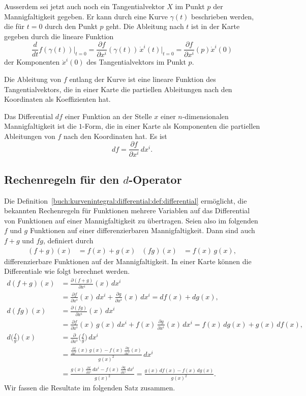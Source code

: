 Ausserdem sei jetzt auch noch ein Tangentialvektor $X$ im Punkt
$p$ der Mannigfaltigkeit gegeben.
Er kann durch eine Kurve $\gamma(t)$ beschrieben werden, die
für $t=0$ durch den Punkt $p$ geht.
Die Ableitung nach $t$ ist in der Karte gegeben durch die
lineare Funktion
\[
\frac{d}{dt}
f(\gamma(t))
\bigg|_{t=0}
=
\frac{\partial f}{\partial x^i}(\gamma(t))\,\dot{x}^i(t)\bigg|_{t=0}
=
\frac{\partial f}{\partial x^i}(p)\dot{x}^i(0)
\]
der Komponenten $\dot{x}^i(0)$ des Tangentialvektors im Punkt $p$.

Die Ableitung von $f$ entlang der Kurve ist eine lineare 
Funktion des Tangentialvektors, die in einer Karte die
partiellen Ableitungen nach den Koordinaten als Koeffizienten
hat.

\begin{definition}
\label{buch:kurvenintegral:differential:def:differential}
Das Differential $df$ einer Funktion an der Stelle $x$ einer
$n$-dimensionalen Mannigfaltigkeit ist die $1$-Form, die in einer
Karte als Komponenten die partiellen Ableitungen von $f$ nach den
Koordinaten hat.
Es ist
\[
df
=
\frac{\partial f}{\partial x^i}\,dx^i.
\]
\end{definition}

%
%
\subsection{Rechenregeln für den $d$-Operator}
Die Definition~\ref{buch:kurvenintegral:differential:def:differential}
ermöglicht, die bekannten Rechenregeln für Funktionen mehrere Variablen
auf das Differential von Funktionen auf einer Mannigfaltigkeit zu
übertragen.
Seien also im folgenden $f$ und $g$ Funktionen auf einer differenzierbaren
Mannigfaltigkeit.
Dann sind auch $f+g$ und $fg$, definiert durch
\begin{align*}
(f+g)(x) &= f(x)+g(x)
&
(fg)(x) &= f(x)\,g(x),
\end{align*}
differenzierbare Funktionen auf der Mannigfaltigkeit.
In einer Karte können die Differentiale wie folgt berechnet werden.
\begin{align*}
d(f+g)(x)
&=
\frac{\partial(f+g)}{\partial x^i}(x)\,dx^i
\\
&=
\frac{\partial f}{\partial x^i}(x)\,dx^i
+
\frac{\partial g}{\partial x^i}(x)\,dx^i
=
df(x) + dg(x),
\\
d(fg)(x)
&=
\frac{\partial (fg)}{\partial x^i}(x)\,dx^i
\\
&=
\frac{\partial f}{\partial x^i}(x)\,g(x)\,dx^i
+
f(x)\,\frac{\partial g}{\partial x^i}(x)\,dx^i
=
f(x)\,dg(x) + g(x)\,df(x),
\\
d\biggl(\frac{f}{g}\biggr)(x)
&=\frac{\partial}{\partial x^i}\biggl(\frac{f}{g}\biggr)\,dx^i
\\
&=
\frac{\displaystyle
\frac{\partial f}{\partial x^i}(x)\,g(x)-f(x)\,\frac{\partial g}{\partial x^i}(x)
}{
g(x)^2
}\,dx^i
\\
&=
\frac{\displaystyle
g(x)\,
\frac{\partial f}{\partial x^i}\,dx^i
-
f(x)\,\frac{\partial g}{\partial x^i}\,dx^i
}{g(x)^2}
=
\frac{g(x)\,df(x)-f(x)\,dg(x)}{g(x)^2}.
\end{align*}
Wir fassen die Resultate im folgenden Satz zusammen.

